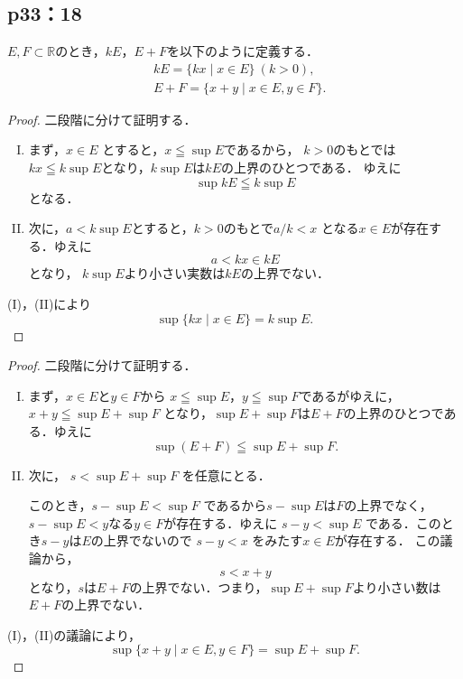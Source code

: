\documentclass[uplatex,dvipdfmx,a4paper,10pt,fleqn]{jsarticle}
\begin{document}
\newpage 

\subsection*{p33：18}

\begin{defi*}
  $E, F \subset \mathbb{R}$のとき，$k E$，$E+F$を以下のように定義する．
  \begin{align*} 
    & kE= \{ kx \mid x \in E \} ~(k>0),\\
    & E+F = \{ x+y \mid x \in E, y \in F \}.
  \end{align*} 
\end{defi*}


\begin{tleftbar} 
  \begin{proof}
  二段階に分けて証明する．
  \begin{enumerate}[(I)]
  \item まず，$x \in E$
  とすると，$ x \leqq \sup E$であるから，
  $k>0$のもとでは$kx \leqq k \sup E$となり，$k \sup E$は$kE$の上界のひとつである．
  ゆえに
  \[
    \sup kE \leqq k \sup E
  \]
  となる．
  \item  次に，$a < k \sup E$とすると，$k>0$のもとで$a/k < x$
  となる$x \in E$が存在する．ゆえに
  \[
    a< kx \in kE
  \]
  となり， $k \sup E$より小さい実数は$kE$の上界でない．
  \end{enumerate}
  (I)，(II)により
  \[
    \sup \{ kx \mid x \in E \} = k \sup E.
  \]
\end{proof}
\end{tleftbar}


\begin{tleftbar} 
  \begin{proof}
  二段階に分けて証明する．
  \begin{enumerate}[(I)]
  \item まず，$ x \in E$と$y \in F$から
  $x \leqq \sup E $，$y \leqq \sup F$であるがゆえに，
  $x+y \leqq \sup E + \sup F$
  となり，$\sup E + \sup F$は$E+F$の上界のひとつである．ゆえに
  \[
  \sup (E+F) \leqq \sup E +\sup F.
  \]
  \item 次に，
  $s < \sup E + \sup F$
  を任意にとる．

  このとき，$ s - \sup E < \sup F$
  であるから$s-\sup E$は$F$の上界でなく，
  $s - \sup E< y$なる$y \in F$が存在する．ゆえに
  $s-y < \sup E$
  である．このとき$s-y$は$E$の上界でないので
  $s-y < x $
  をみたす$ x \in E$が存在する．
  この議論から，
  \[
  s< x+y
\]
  となり，$s$は$E+F$の上界でない．つまり，$\sup E + \sup F$より小さい数は$E+F$の上界でない．
\end{enumerate}
(I)，(II)の議論により，
\[
\sup \{ x+y \mid x \in E,y \in  F \} = \sup E + \sup F.
\]
\end{proof}
\end{tleftbar}
\end{document}
